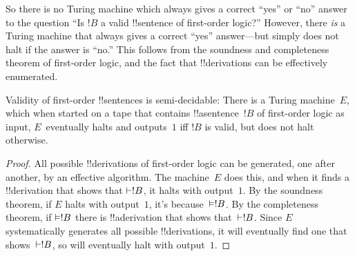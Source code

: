 \documentclass[../../../include/open-logic-section]{subfiles}
\begin{document}
\begin{explain}
So there is no Turing machine which always gives a
correct ``yes'' or ``no'' answer to the question ``Is $!B$ a valid
!!{sentence} of first-order logic?'' However, there \emph{is} a Turing
machine that always gives a correct ``yes'' answer---but simply does
not halt if the answer is ``no.'' This follows from the soundness and
completeness theorem of first-order logic, and the fact that
!!{derivation}s can be effectively enumerated.
\end{explain}

\begin{thm}
  Validity of first-order !!{sentence}s is semi-decidable: There is a
  Turing machine~$E$, which when started on a tape that contains
  !!a{sentence}~$!B$ of first-order logic as input, $E$~eventually
  halts and outputs~$1$ iff $!B$ is valid, but does not halt
  otherwise.
\end{thm}

\begin{proof}
  All possible !!{derivation}s of first-order logic can be generated,
  one after another, by an effective algorithm.  The machine~$E$ does
  this, and when it finds a !!{derivation} that shows that $\Proves
  !B$, it halts with output~$1$. By the soundness theorem, if $E$
  halts with output~$1$, it's because~$\Entails !B$. By the
  completeness theorem, if $\Entails !B$ there is !!a{derivation} that
  shows that~$\Proves !B$. Since $E$ systematically generates all
  possible !!{derivation}s, it will eventually find one that
  shows~$\Proves !B$, so will eventually halt with output~$1$.
\end{proof}
\end{document}
